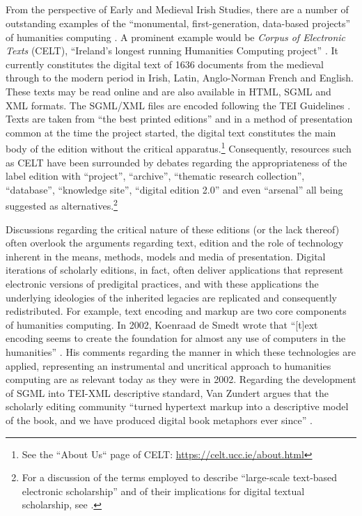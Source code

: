 \begin{paper}
\section*{}
From the perspective of Early and Medieval Irish Studies, there are a number of outstanding examples of the ``monumental, first-generation, data-based projects'' of humanities computing \citep[711--712]{davidson_humanities_2008}. A prominent example would be \textit{Corpus of Electronic Texts} (CELT), ``Ireland’s longest running Humanities Computing project'' \citeyearpar{corpus_celt}. It currently constitutes the digital text of 1636 documents from the medieval through to the modern period in Irish, Latin, Anglo-Norman French and English. These texts may be read online and are also available in HTML, SGML and XML formats. The SGML/XML files are encoded following the TEI Guidelines \citep{the_tei_consortium_tei_2020}. Texts are taken from ``the best printed editions'' and in a method of presentation common at the time the project started, the digital text constitutes the main body of the edition without the critical apparatus.\footnote{See the ``About Us`` page of CELT: \url{https://celt.ucc.ie/about.html}} Consequently, resources such as CELT have been surrounded by debates regarding the appropriateness of the label edition with ``project'', ``archive'', ``thematic research collection'', ``database'', ``knowledge site'', ``digital edition 2.0'' and even ``arsenal'' all being suggested as alternatives.\footnote{For a discussion of the terms employed to describe ``large-scale text-based electronic scholarship'' and of their implications for digital textual scholarship, see \citealt{price_edition_2009}.}  

Discussions regarding the critical nature of these editions (or the lack thereof) often overlook the arguments regarding text, edition and the role of technology inherent in the means, methods, models and media of presentation. Digital iterations of scholarly editions, in fact, often deliver applications that represent electronic versions of predigital practices, and with these applications the underlying ideologies of the inherited legacies are replicated and consequently redistributed. For example, text encoding and markup are two core components of humanities computing. In 2002, Koenraad de Smedt wrote that ``[t]ext encoding seems to create the foundation for almost any use of computers in the humanities'' \citep[qtd. in][66]{svensson_big_2016}. His comments regarding the manner in which these technologies are applied, representing an instrumental and uncritical approach to humanities computing are as relevant today as they were in 2002. Regarding the development of SGML into TEI-XML descriptive standard, Van Zundert argues that the scholarly editing community ``turned hypertext markup into a descriptive model of the book, and we have produced digital book metaphors ever since'' \citep{zundert_case_2016}. 


\end{paper}
